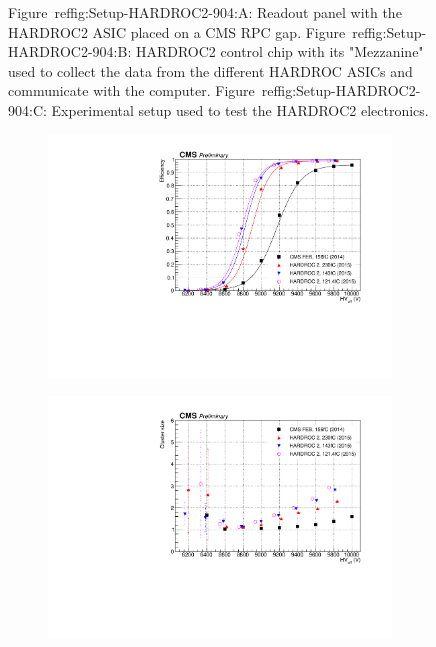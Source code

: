 \begin{figure}[H]
\begin{subfigure}{\linewidth}
			\caption{\label{fig:Setup-HARDROC2-904:C}}
		\end{subfigure}
		\caption{\label{fig:Setup-HARDROC2-904} Figure~ref{fig:Setup-HARDROC2-904:A}: Readout panel with the HARDROC2 ASIC placed on a CMS RPC gap. Figure~ref{fig:Setup-HARDROC2-904:B}: HARDROC2 control chip with its "Mezzanine" used to collect the data from the different HARDROC ASICs and communicate with the computer. Figure~ref{fig:Setup-HARDROC2-904:C}: Experimental setup used to test the HARDROC2 electronics.}
    \end{figure}
	
	\begin{figure}[H]
		\begin{subfigure}{.5\linewidth}
		    \centering
			\includegraphics[width=\linewidth]{fig/chapt6/HARDROC2-Eff-Shift.pdf}
			\caption{\label{fig:HARDROC2:A}}
		\end{subfigure}
		\begin{subfigure}{.5\linewidth}
		    \centering
			\includegraphics[width = \linewidth]{fig/chapt6/HARDROC2-ClS-Shift.pdf}

\end{subfigure}
\end{figure}
